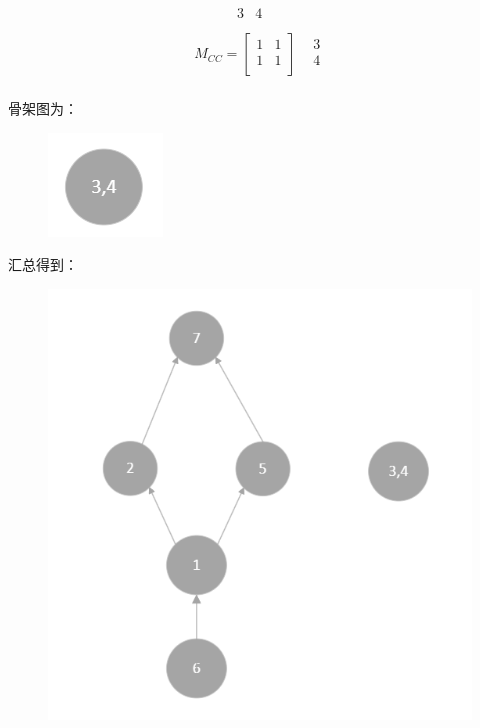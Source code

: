 \documentclass[UTF8]{ctexart}
\begin{document}
$$
\begin{matrix}\begin{matrix}~~~~~~~~~~~~3&4\\\end{matrix}&\ \\M_{CC}=\left[\begin{matrix}1&1\\1&1\\\end{matrix}\right]&\begin{matrix}3\\4\\\end{matrix}\\\end{matrix}
$$

骨架图为：

\begin{figure}[H]
  \centering
  \includegraphics[scale=0.8]{3.png}
\end{figure}

汇总得到：

\begin{figure}[H]
  \centering
  \includegraphics[scale=0.8]{4.png}
\end{figure}
\end{document}
